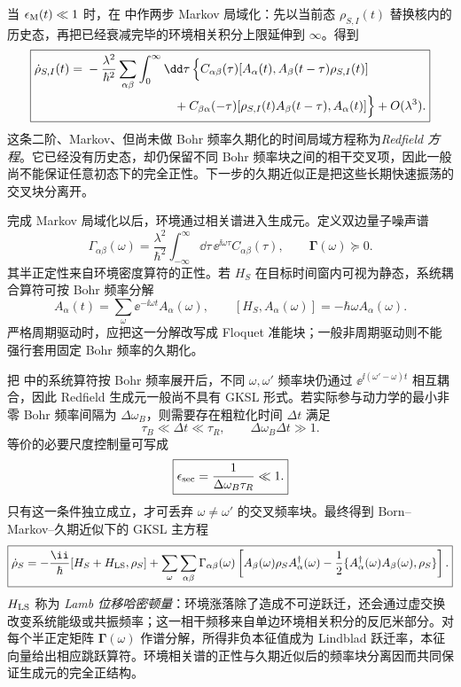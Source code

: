 当 $\epsilon_{\rm M}(t)\ll1$ 时，在 中作两步 Markov 局域化：先以当前态 $\rho_{S,I}(t)$ 替换核内的历史态，再把已经衰减完毕的环境相关积分上限延伸到 $\infty$。得到
\begin{equation}
\boxed{
\begin{aligned}
\dot\rho_{S,I}(t)
={}&-\frac{\lambda^2}{\hbar^2}
\sum_{\alpha\beta}\int_0^\infty\dd\tau\,
\Big\{
C_{\alpha\beta}(\tau)
[A_\alpha(t),A_\beta(t-\tau)\rho_{S,I}(t)]\\
&\hspace{25mm}+C_{\beta\alpha}(-\tau)
[\rho_{S,I}(t)A_\beta(t-\tau),A_\alpha(t)]
\Big\}+O(\lambda^3).
\end{aligned}}
\label{eq:redfield_markov_nonsecular}
\end{equation}
这条二阶、Markov、但尚未做 Bohr 频率久期化的时间局域方程称为\emph{Redfield 方程}。它已经没有历史态，却仍保留不同 Bohr 频率块之间的相干交叉项，因此一般尚不能保证任意初态下的完全正性。下一步的久期近似正是把这些长期快速振荡的交叉块分离开。

完成 Markov 局域化以后，环境通过相关谱进入生成元。定义双边量子噪声谱
\begin{equation}
\boxed{
\Gamma_{\alpha\beta}(\omega)
=\frac{\lambda^2}{\hbar^2}\int_{-\infty}^{\infty}\dd\tau\,
\ee^{\ii\omega\tau}C_{\alpha\beta}(\tau),
\qquad
\boldsymbol\Gamma(\omega)\succeq0.}
\label{eq:quantum_bath_noise_spectrum}
\end{equation}
其半正定性来自环境密度算符的正性。若 $H_S$ 在目标时间窗内可视为静态，系统耦合算符可按 Bohr 频率分解
\[
A_\alpha(t)=\sum_\omega\ee^{-\ii\omega t}A_\alpha(\omega),
\qquad
[H_S,A_\alpha(\omega)]=-\hbar\omega A_\alpha(\omega).
\]
严格周期驱动时，应把这一分解改写成 Floquet 准能块；一般非周期驱动则不能强行套用固定 Bohr 频率的久期化。

把 中的系统算符按 Bohr 频率展开后，不同 $\omega,\omega'$ 频率块仍通过 $\ee^{\ii(\omega'-\omega)t}$ 相互耦合，因此 Redfield 生成元一般尚不具有 GKSL 形式。若实际参与动力学的最小非零 Bohr 频率间隔为 $\Delta\omega_B$，则需要存在粗粒化时间 $\Delta t$ 满足
\[
\tau_B\ll\Delta t\ll\tau_R,
\qquad
\Delta\omega_B\Delta t\gg1.
\]
等价的必要尺度控制量可写成
\begin{equation}
\boxed{
\epsilon_{\rm sec}=\frac1{\Delta\omega_B\tau_R}\ll1.}
\label{eq:secular_control_parameter}
\end{equation}
只有这一条件独立成立，才可丢弃 $\omega\neq\omega'$ 的交叉频率块。最终得到 Born--Markov--久期近似下的 GKSL 主方程
\begin{equation}
\boxed{
\dot\rho_S
=-\frac{\ii}{\hbar}[H_S+H_{\rm LS},\rho_S]
+\sum_\omega\sum_{\alpha\beta}\Gamma_{\alpha\beta}(\omega)
\left[
A_\beta(\omega)\rho_SA_\alpha^\dagger(\omega)
-\frac12\{A_\alpha^\dagger(\omega)A_\beta(\omega),\rho_S\}
\right].}
\label{eq:born_markov_secular_gksl}
\end{equation}
$H_{\rm LS}$ 称为 \emph{Lamb 位移哈密顿量}：环境涨落除了造成不可逆跃迁，还会通过虚交换改变系统能级或共振频率；这一相干频移来自单边环境相关积分的反厄米部分。对每个半正定矩阵 $\boldsymbol\Gamma(\omega)$ 作谱分解，所得非负本征值成为 Lindblad 跃迁率，本征向量给出相应跳跃算符。环境相关谱的正性与久期近似后的频率块分离因而共同保证生成元的完全正结构。

